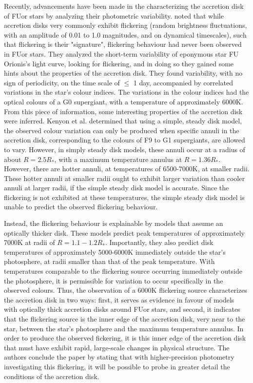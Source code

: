 \documentclass[iop,apj,tighten]{emulateapj}
\begin{document}
Recently, advancements have been made in the characterizing the accretion disk of FUor stars by analyzing their photometric variability. \cite{kenyon_flickering_2000} noted that while accretion disks very commonly exhibit flickering (random brightness fluctuations, with an amplitude of 0.01 to 1.0 magnitudes, and on dynamical timescales), such that flickering is their "signature", flickering behaviour had never been observed in FUor stars. They analyzed the short-term variability of eponymous star FU Orionis's light curve, looking for flickering, and in doing so they gained some hints about the properties of the accretion disk. They found variability, with no sign of periodicity, on the time scale of $\leq$ 1 day, accompanied by correlated variations in the star's colour indices. The variations in the colour indices had the optical colours of a G0 supergiant, with a temperature of approximately 6000K. From this piece of information, some interesting properties of the accretion disk were inferred. Kenyon et al. determined that using a simple, steady disk model, the observed colour variation can only be produced when specific annuli in the accretion disk, corresponding to the colours of F9 to G1 supergiants, are allowed to vary. However, in simply steady disk models, these annuli occur at a radius of about $R=2.5R_{*}$, with a maximum temperature annulus at $R=1.36R_{*}$. However, there are hotter annuli, at temperatures of 6500-7000K, at smaller radii. These hotter annuli at smaller radii ought to exhibit larger variation than cooler annuli at larger radii, if the simple steady disk model is accurate. Since the flickering is not exhibited at these temperatures, the simple steady disk model is unable to predict the observed flickering behaviour.

Instead, the flickering behaviour is explainable by models that assume an optically thicker disk. These models predict peak temperatures of approximately 7000K at radii of $R=1.1-1.2R_{*}$. Importantly, they also predict disk temperatures of approximately 5000-6000K immediately outside the star's photosphere, at radii smaller than that of the peak temperature. With temperatures comparable to the flickering source occurring immediately outside the photosphere, it is permissible for variation to occur specifically in the observed colours. Thus, the observation of a 6000K flickering source characterizes the accretion disk in two ways: first, it serves as evidence in favour of models with optically thick accretion disks around FUor stars, and second, it indicates that the flickering source is the inner edge of the accretion disk, very near to the star, between the star's photosphere and the maximum temperature annulus. In order to produce the observed fickering, it is this inner edge of the accretion disk that must have exhibit rapid, large-scale changes in physical structure. The authors conclude the paper by stating that with higher-precision photometry investigating this flickering, it will be possible to probe in greater detail the conditions of the accretion disk.
\end{document}
